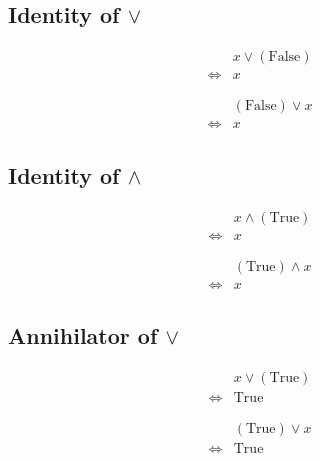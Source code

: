 \subsection{Identity of $\lor$}
\begin{prop}
\label{Proposition:lor_identity_1}
\begin{align*}
& x \lor (\text{False}) \\
\iff & x
\end{align*}
\end{prop}

\begin{prop}
\label{Proposition:lor_identity_2}
\begin{align*}
& (\text{False}) \lor x \\
\iff & x
\end{align*}
\end{prop}

\subsection{Identity of $\land$}
\begin{prop}
\label{Proposition:land_identity_1}
\begin{align*}
& x \land (\text{True}) \\
\iff & x
\end{align*}
\end{prop}

\begin{prop}
\label{Proposition:land_identity_2}
\begin{align*}
& (\text{True}) \land x \\
\iff & x
\end{align*}
\end{prop}

\subsection{Annihilator of $\lor$}
\begin{prop}
\label{Proposition:lor_annihilator_1}
\begin{align*}
& x \lor (\text{True}) \\
\iff & \text{True}
\end{align*}
\end{prop}

\begin{prop}
\label{Proposition:lor_annihilator_2}
\begin{align*}
& (\text{True}) \lor x \\
\iff & \text{True}
\end{align*}
\end{prop}

